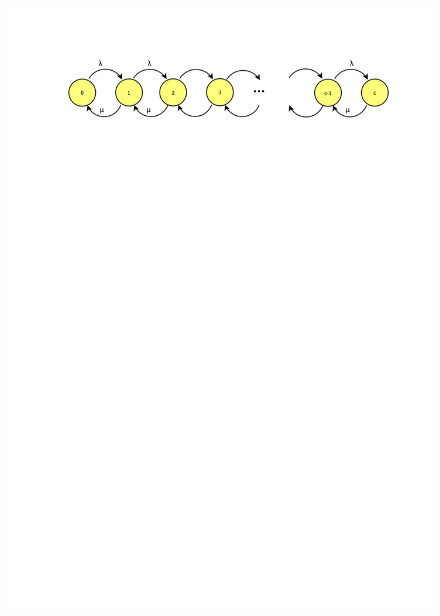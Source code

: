 		\begin{figure}[h]
			\centering\includegraphics[trim = 10mm 220mm 10mm 25mm, clip,width=0.9\linewidth]{MMc}
		\end{figure}
		

